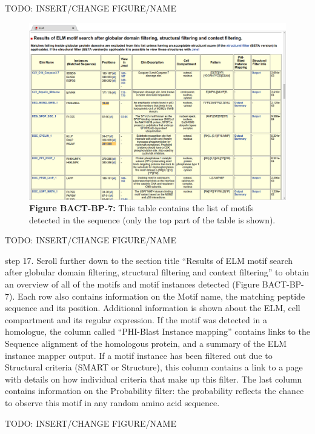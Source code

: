 \begin{enumerate}
TODO: INSERT/CHANGE FIGURE/NAME

\begin{figure}[h!]
	\centering
	\includegraphics[width=\textwidth]{Figures/predicting_p53/elm_results_motifs.png}
	\caption{
	\textbf{Figure BACT-BP-7:} This table contains the list of motifs
	detected in the sequence (only the top part of the table is shown).
	}
\end{figure}

TODO: INSERT/CHANGE FIGURE/NAME

step 17. Scroll further down to the section title ``Results of ELM motif
search after globular domain filtering, structural filtering and context
filtering'' to obtain an overview of all of the motifs and motif
instances detected (Figure BACT-BP-7). Each row also contains
information on the Motif name, the matching peptide sequence and its
position. Additional information is shown about the ELM, cell
compartment and its regular expression. If the motif was detected in a
homologue, the column called ``PHI-Blast Instance mapping'' contains
links to the Sequence alignment of the homologous protein, and a summary
of the ELM instance mapper output. If a motif instance has been filtered
out due to Structural criteria (SMART or Structure), this column
contains a link to a page with details on how individual criteria that
make up this filter. The last column contains information on the
Probability filter: the probability reflects the chance to observe this
motif in any random amino acid sequence.

TODO: INSERT/CHANGE FIGURE/NAME


\end{enumerate}
